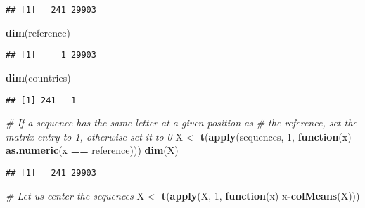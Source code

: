 \documentclass[]{article}
\newenvironment{Shaded}{\begin{snugshade}}{\end{snugshade}}
\newcommand{\CommentTok}[1]{\textcolor[rgb]{0.56,0.35,0.01}{\textit{#1}}}
\newcommand{\ControlFlowTok}[1]{\textcolor[rgb]{0.13,0.29,0.53}{\textbf{#1}}}
\newcommand{\DecValTok}[1]{\textcolor[rgb]{0.00,0.00,0.81}{#1}}
\newcommand{\KeywordTok}[1]{\textcolor[rgb]{0.13,0.29,0.53}{\textbf{#1}}}
\newcommand{\NormalTok}[1]{#1}
\newcommand{\OperatorTok}[1]{\textcolor[rgb]{0.81,0.36,0.00}{\textbf{#1}}}
\newcommand{\StringTok}[1]{\textcolor[rgb]{0.31,0.60,0.02}{#1}}
\begin{document}
\begin{verbatim}
## [1]   241 29903
\end{verbatim}

\begin{Shaded}
\begin{Highlighting}[]
\KeywordTok{dim}\NormalTok{(reference)}
\end{Highlighting}
\end{Shaded}

\begin{verbatim}
## [1]     1 29903
\end{verbatim}

\begin{Shaded}
\begin{Highlighting}[]
\KeywordTok{dim}\NormalTok{(countries)}
\end{Highlighting}
\end{Shaded}

\begin{verbatim}
## [1] 241   1
\end{verbatim}

\begin{Shaded}
\begin{Highlighting}[]
\CommentTok{# If a sequence has the same letter at a given position as }
\CommentTok{# the reference, set the matrix entry to 1, otherwise set it to 0 }
\NormalTok{X <-}\StringTok{ }\KeywordTok{t}\NormalTok{(}\KeywordTok{apply}\NormalTok{(sequences, }\DecValTok{1}\NormalTok{, }\ControlFlowTok{function}\NormalTok{(x) }\KeywordTok{as.numeric}\NormalTok{(x }\OperatorTok{==}\StringTok{ }\NormalTok{reference)))}
\KeywordTok{dim}\NormalTok{(X)}
\end{Highlighting}
\end{Shaded}

\begin{verbatim}
## [1]   241 29903
\end{verbatim}

\begin{Shaded}
\begin{Highlighting}[]
\CommentTok{# Let us center the sequences}
\NormalTok{X <-}\StringTok{ }\KeywordTok{t}\NormalTok{(}\KeywordTok{apply}\NormalTok{(X, }\DecValTok{1}\NormalTok{, }\ControlFlowTok{function}\NormalTok{(x) x}\OperatorTok{-}\KeywordTok{colMeans}\NormalTok{(X)))}
\end{Highlighting}
\end{Shaded}
\end{document}
